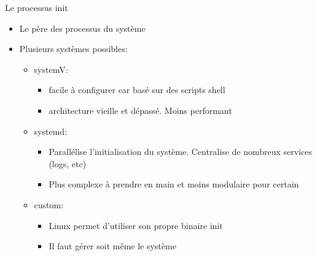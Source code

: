 \begin{frame}{Le processus init}
  \begin{itemize}
  \item Le père des processus du système
  \item Plusieurs systèmes possibles:
    \begin{itemize}
    \item systemV:
      \begin{itemize}
      \item facile à configurer car basé sur des scripts shell
      \item architecture vieille et dépassé. Moins performant
      \end{itemize}
    \item systemd:
      \begin{itemize}
      \item Parallélise l'initialisation du système. Centralise de nombreux services (logs, etc)
      \item Plus complexe à prendre en main et moins modulaire pour certain
      \end{itemize}
    \item custom:
      \begin{itemize}
      \item Linux permet d'utiliser son propre binaire init
      \item Il faut gérer soit même le système
      \end{itemize}
    \end{itemize}
  \end{itemize}
\end{frame}
